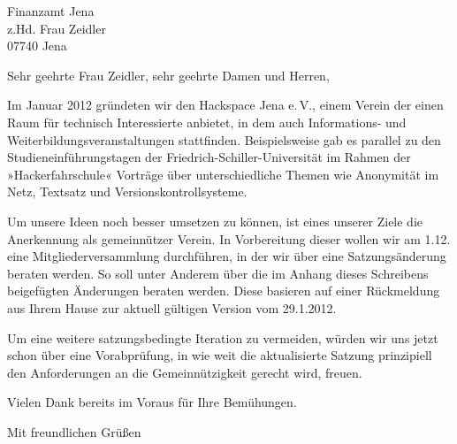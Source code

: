 \documentclass[fontsize=12pt,paper=a4,DIN]{scrlttr2}
\date{3. November 2012}
\begin{document}
\begin{letter}{Finanzamt Jena \\
z.Hd. Frau Zeidler \\
07740 Jena}


\opening{Sehr geehrte Frau Zeidler, sehr geehrte Damen und Herren,}

Im Januar 2012 gründeten wir den Hackspace Jena e.\,V., einem Verein 
der einen Raum für technisch Interessierte anbietet, in dem auch 
Informations- und Weiterbildungsveranstaltungen stattfinden. 
Beispielsweise gab es parallel zu den Studieneinführungstagen der 
Friedrich-Schiller-Universität im Rahmen der »Hackerfahrschule« 
Vorträge über unterschiedliche Themen wie Anonymität im Netz, 
Textsatz und Versionskontrollsysteme.

Um unsere Ideen noch besser umsetzen zu können, ist eines unserer 
Ziele die Anerkennung als gemeinnützer Verein. In Vorbereitung 
dieser wollen wir am 1.12. eine Mitgliederversammlung durchführen, 
in der wir über eine Satzungsänderung beraten werden. So soll unter 
Anderem über die im Anhang dieses Schreibens beigefügten Änderungen 
beraten werden. Diese basieren auf einer Rückmeldung aus Ihrem Hause 
zur aktuell gültigen Version vom 29.1.2012. 

Um eine weitere satzungsbedingte Iteration zu vermeiden, würden wir 
uns jetzt schon über eine Vorabprüfung, in wie weit die 
aktualisierte Satzung prinzipiell den Anforderungen an die 
Gemeinnützigkeit gerecht wird, freuen. 


Vielen Dank bereits im Voraus für Ihre Bemühungen.

\closing{Mit freundlichen Grüßen}
\end{letter}
\end{document}
